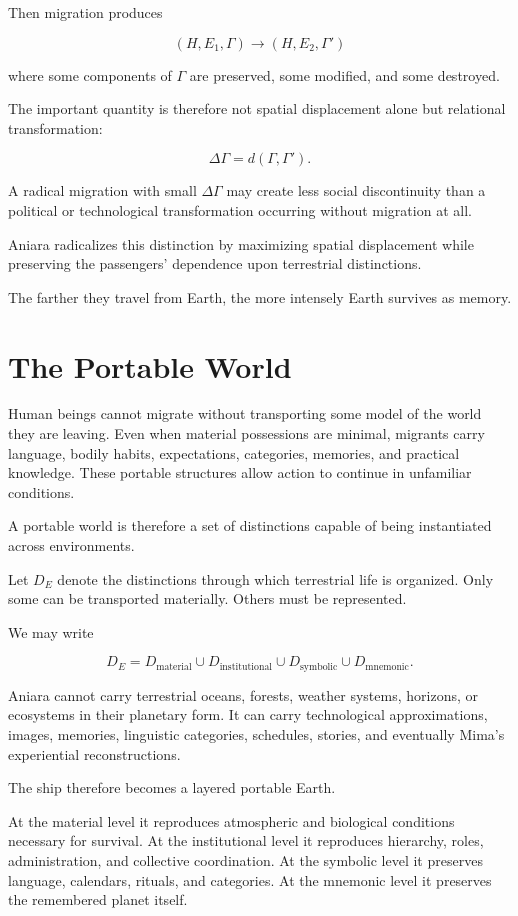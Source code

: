 \documentclass[11pt,oneside]{book}
\theoremstyle{definition}
\theoremstyle{remark}
\begin{document}
Then migration produces

\[
(H,E_1,\Gamma)
\longrightarrow
(H,E_2,\Gamma')
\]

where some components of \(\Gamma\) are preserved, some modified, and some destroyed.

The important quantity is therefore not spatial displacement alone but relational transformation:

\[
\Delta\Gamma
=
d(\Gamma,\Gamma').
\]

A radical migration with small \(\Delta\Gamma\) may create less social discontinuity than a political or technological transformation occurring without migration at all.

Aniara radicalizes this distinction by maximizing spatial displacement while preserving the passengers' dependence upon terrestrial distinctions.

The farther they travel from Earth, the more intensely Earth survives as memory.

\section{The Portable World}

Human beings cannot migrate without transporting some model of the world they are leaving. Even when material possessions are minimal, migrants carry language, bodily habits, expectations, categories, memories, and practical knowledge. These portable structures allow action to continue in unfamiliar conditions.

A portable world is therefore a set of distinctions capable of being instantiated across environments.

Let \(D_E\) denote the distinctions through which terrestrial life is organized. Only some can be transported materially. Others must be represented.

We may write

\[
D_E
=
D_{\mathrm{material}}
\cup
D_{\mathrm{institutional}}
\cup
D_{\mathrm{symbolic}}
\cup
D_{\mathrm{mnemonic}}.
\]

Aniara cannot carry terrestrial oceans, forests, weather systems, horizons, or ecosystems in their planetary form. It can carry technological approximations, images, memories, linguistic categories, schedules, stories, and eventually Mima's experiential reconstructions.

The ship therefore becomes a layered portable Earth.

At the material level it reproduces atmospheric and biological conditions necessary for survival. At the institutional level it reproduces hierarchy, roles, administration, and collective coordination. At the symbolic level it preserves language, calendars, rituals, and categories. At the mnemonic level it preserves the remembered planet itself.
\end{document}
